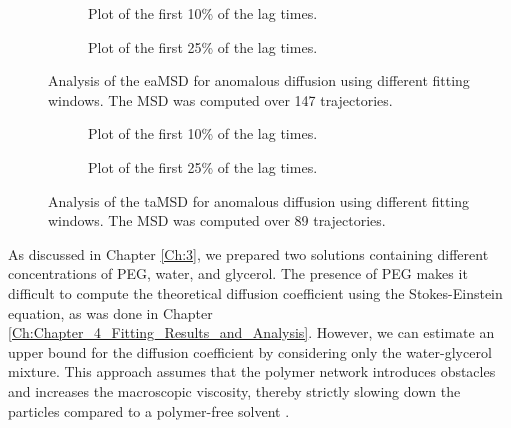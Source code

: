 \begin{figure}[!htbp]
    \centering
    \begin{subfigure}[t]{0.48\textwidth}
        \centering
        
        \caption{Plot of the first 10\% of the lag times.}
    \end{subfigure}
    \hfill
    \begin{subfigure}[t]{0.48\textwidth}
        \centering
        
        \caption{Plot of the first 25\% of the lag times.}
    \end{subfigure}

    \caption{Analysis of the eaMSD for anomalous diffusion using different fitting windows. The MSD was computed over 147 trajectories.}
    \label{fig:anomalous_eaMSD_plots}
\end{figure}
\FloatBarrier

\begin{figure}[!htbp]
    \centering
    \begin{subfigure}[t]{0.48\textwidth}
        \centering
        
        \caption{Plot of the first 10\% of the lag times.}
    \end{subfigure}
    \hfill
    \begin{subfigure}[t]{0.48\textwidth}
        \centering
        
        \caption{Plot of the first 25\% of the lag times.}
    \end{subfigure}

    \caption{Analysis of the taMSD for anomalous diffusion using different fitting windows. The MSD was computed over 89 trajectories.}
    \label{fig:anomalous_taMSD_plots}
\end{figure}
\FloatBarrier


As discussed in Chapter \ref{Ch:3}, we prepared two solutions containing different concentrations of PEG, water, and glycerol. The presence of PEG makes it difficult to compute the theoretical diffusion coefficient using the Stokes-Einstein equation, as was done in Chapter \ref{Ch:Chapter_4_Fitting_Results_and_Analysis}. However, we can estimate an upper bound for the diffusion coefficient by considering only the water-glycerol mixture. This approach assumes that the polymer network introduces obstacles and increases the macroscopic viscosity, thereby strictly slowing down the particles compared to a polymer-free solvent \cite{ijms241311148, doi:10.1021/acs.langmuir.7b03418}. 

